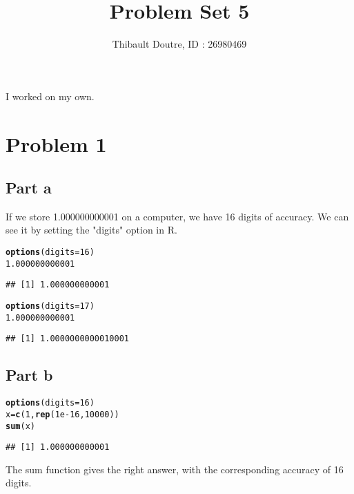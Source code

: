 \documentclass{llncs}\usepackage[]{graphicx}\usepackage[]{color}
\makeatletter
\newcommand{\hlnum}[1]{\textcolor[rgb]{0.686,0.059,0.569}{#1}}%
\newcommand{\hlstd}[1]{\textcolor[rgb]{0.345,0.345,0.345}{#1}}%
\newcommand{\hlkwb}[1]{\textcolor[rgb]{0.69,0.353,0.396}{#1}}%
\newcommand{\hlkwc}[1]{\textcolor[rgb]{0.333,0.667,0.333}{#1}}%
\newcommand{\hlkwd}[1]{\textcolor[rgb]{0.737,0.353,0.396}{\textbf{#1}}}%
\newenvironment{kframe}{%
 \def\at@end@of@kframe{}%
 \ifinner\ifhmode%
  \def\at@end@of@kframe{\end{minipage}}%
  \begin{minipage}{\columnwidth}%
 \fi\fi%
 \def\FrameCommand##1{\hskip\@totalleftmargin \hskip-\fboxsep
 \colorbox{shadecolor}{##1}\hskip-\fboxsep
     \hskip-\linewidth \hskip-\@totalleftmargin \hskip\columnwidth}%
 \MakeFramed {\advance\hsize-\width
   \@totalleftmargin\z@ \linewidth\hsize
   \@setminipage}}%
 {\par\unskip\endMakeFramed%
 \at@end@of@kframe}
\newenvironment{knitrout}{}{} %
\makeatother
\begin{document}
\title{Problem Set 5}
\author{Thibault Doutre, ID : 26980469}
\date{}
\maketitle
\bigbreak
\noindent
I worked on my own.
\section{Problem 1}
\subsection{Part a}
If we store 1.000000000001 on a computer, we have 16 digits of accuracy. We can see it by setting the "digits" option in R.
\begin{knitrout}
\color{fgcolor}\begin{kframe}
\begin{alltt}
\hlkwd{options}\hlstd{(}\hlkwc{digits}\hlstd{=}\hlnum{16}\hlstd{)}
\hlnum{1.000000000001}
\end{alltt}
\begin{lstlisting}[basicstyle=\ttfamily,breaklines=true]
## [1] 1.000000000001
\end{lstlisting}
\begin{alltt}
\hlkwd{options}\hlstd{(}\hlkwc{digits}\hlstd{=}\hlnum{17}\hlstd{)}
\hlnum{1.000000000001}
\end{alltt}
\begin{lstlisting}[basicstyle=\ttfamily,breaklines=true]
## [1] 1.0000000000010001
\end{lstlisting}
\end{kframe}
\end{knitrout}


\subsection{Part b}
\begin{knitrout}
\color{fgcolor}\begin{kframe}
\begin{alltt}
\hlkwd{options}\hlstd{(}\hlkwc{digits}\hlstd{=}\hlnum{16}\hlstd{)}
\hlstd{x} \hlkwb{=} \hlkwd{c}\hlstd{(}\hlnum{1}\hlstd{,}\hlkwd{rep}\hlstd{(}\hlnum{1e-16}\hlstd{,}\hlnum{10000}\hlstd{))}
\hlkwd{sum}\hlstd{(x)}
\end{alltt}
\begin{lstlisting}[basicstyle=\ttfamily,breaklines=true]
## [1] 1.000000000001
\end{lstlisting}
\end{kframe}
\end{knitrout}
The sum function gives the right answer, with the corresponding accuracy of 16 digits.
\end{document}
